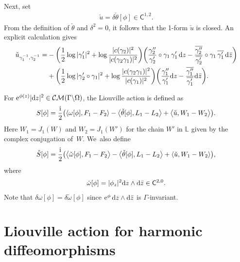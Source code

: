 \documentclass[10pt,a4paper]{amsart}
\numberwithin{equation}{section}
\newcommand{\ov}{\overline}
\begin{document}
Next, set
\begin{gather*}
\check{u}=\delta \check{\theta}[\phi] \in \mathsf{C}^{1,2}.
\end{gather*}
From the definition of $\check{\theta}$ and $\delta^2=0$, it follows that the
1-form $\check{u}$ is closed. An explicit calculation gives
\begin{align*} \check{u}_{\gamma_1^{-1},\gamma_2^{-1}}= & -\bigg(\frac{1}{2}\log|\gamma_1'|^2+\log\frac{|c(\gamma_2)|^2}{|c(\gamma_2\gamma_1)|^2}\bigg)
\bigg(\frac{\gamma_2''}{\gamma_2'}\circ\gamma_1\, \gamma_1'\, {\rm d}z -
\frac{\ov{\gamma_2''}}{\ov{\gamma_2'}}\circ\gamma_1\, \ov{\gamma_1'}\,{\rm d}\bar{z}\bigg)
\\
 & + \bigg(\frac{1}{2}\log|\gamma_2'\circ\gamma_1|^2+\log\frac{|c(\gamma_2\gamma_1)|^2}{|c(\gamma_1)|^2}\bigg) \bigg(\frac{\gamma_1''}{\gamma_1'} {\rm d}z -
\frac{\ov{\gamma_1''}}{\ov{\gamma_1'}}{\rm d}\bar{z}\bigg).
\end{align*}

For ${\rm e}^{\phi(z)}|{\rm d}z|^2\in \mathcal{CM}(\Gamma\backslash \Omega)$, the Liouville action is defined as
\begin{gather*}%
S[\phi]=\frac{\rm i}{2}\bigl(\langle \omega[\phi], F_1-F_2 \rangle-\big\langle\check{\theta}[\phi], L_1-L_2\big\rangle+\big\langle \check{u}, W_1-W_2\big\rangle\bigr).
\end{gather*}
Here $W_1=J_1(W)$ and $W_2=J_1(W')$ for the chain $W'$ in $\mathbb{L}$ given by the complex conjugation of~$W$. We~also define
\begin{gather}\label{e:def-check-S}
\check{S}[\phi]=\frac{\rm i}{2}\bigl(\big\langle \check{\omega}[\phi], F_1-F_2\big\rangle-\big\langle\check{\theta}[\phi], L_1-L_2\big\rangle+\langle \check{u}, W_1-W_2\rangle\bigr),
\end{gather}
where
\begin{gather*}
\check{\omega}[\phi] = |\phi_{z}|^2 {\rm d}z\wedge {\rm d}\bar{z}\in \mathsf{C}^{2,0}.
\end{gather*}
Note that $\delta \omega[\phi] =\delta \check{\omega}[\phi]$ since ${\rm e}^\phi \,{\rm d}z\wedge {\rm d}\bar{z}$ is $\Gamma$-invariant.

\section{Liouville action for harmonic diffeomorphisms}\label{s:harmonic}
\end{document}
